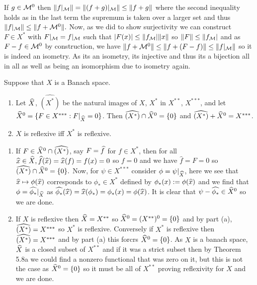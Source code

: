 \documentclass[12pt,a4paper]{article}
\begin{document}
\begin{solution}
\begin{enumerate}[label=\alph*.]
            If $g\in\mathcal{M}^0$ then $\|f|_{\mathcal{M}}\|=\|(f+g)|_{\mathcal{M}}\|\leq\|f+g\|$ where the second inequality holds as in the last term the supremum is taken over a larger set and thus $\|f|_{\mathcal{M}}\|\leq\|f+\mathcal{M}^0\|.$ 
            Now, as we did to show surjectivity we can construct $F\in X^*$ with $F|_{\mathcal{M}}=f|_{\mathcal{M}}$ such that $|F(x)|\leq\|f_{\mathcal{M}}|\|x\|$ so $\|F\|\leq\|f_{\mathcal{M}}|$ and as $F-f\in\mathcal{M}^0$ by construction, we have $\|f+\mathcal{M}^0\|\leq\|f+(F-f)\|\leq\|f|_{\mathcal{M}}\|$ so it is indeed an isometry. 
            As its an isometry, its injective and thus its a bijection all in all as well as being an isomorphism due to isometry again. 
    \end{enumerate}
\end{solution}
\begin{problem}\label{prob:5-24}
Suppose that $X$ is a Banach space.
\begin{enumerate}[label=\alph*.]
\item Let $\widehat{X}$, $\widehat{(X^*)}$ be the natural images of $X$, $X^*$ in $X^{**}$, $X^{***}$, and let $\widehat{X}^0 = \{F \in X^{***} : F|_{\widehat{X}} = 0\}$. Then $\widehat{(X^*)} \cap \widehat{X}^0 = \{0\}$ and $\widehat{(X^*)} + \widehat{X}^0 = X^{***}$.
\item $X$ is reflexive iff $X^*$ is reflexive.
\end{enumerate}
\end{problem}
\begin{solution}
    \begin{enumerate}[label=\alph*.]
        \item If $F\in\widehat{X}^0\cap\widehat{(X^*)}$, say $F=\widehat{f}$ for $f\in X^*$, then for all $\widehat{x}\in\widehat{X},\widehat{f}(\widehat{x})=\widehat{x}(f)=f(x)=0$ so $f=0$ and we have $\hat{f}=F=0$ so $\widehat{(X^*)}\cap\widehat{X}^0= \qty{0}.$ 
            Now, for $\psi\in X^{***}$ consider $\phi=\psi|_{\widehat{X}}$, here we see that $\widehat{x}\mapsto\phi(\widehat{x})$ corresponds to $\phi_*\in X^*$ defined by $\phi_*(x):=\phi(\widehat{x})$ and we find that $\phi=\widehat{\phi_*}|_{\widehat{X}}$ as $\widehat{\phi_*}(\widehat{x})=\widehat{x}(\phi_*)=\phi_*(x)=\phi(\widehat{x})$. 
            It is clear that $\psi-\widehat{\phi_*}\in\widehat{X}^0$ so we are done. 
        \item If $X$ is reflexive then $\widehat{X}=X^{**}$ so $\widehat{X}^0=(X^{**})^0= \qty{0}$ and by part (a), $\widehat{(X^*)}=X^{***}$ so $X^*$ is reflexive. 
            Conversely if $X^*$ is reflexive then $\widehat{(X^*)}=X^{***}$ and by part (a) this forcrs $\widehat{X}^0= \qty{0}$. 
            As $X$ is a banach space, $\widehat{X}$ is a closed subset of $X^{**}$ and if it was a strict subset then by Theorem 5.8a we could find a nonzero functional that was zero on it, but this is not the case as $\widehat{X}^0=\qty{0}$ so it must be all of $X^{**}$ proving reflexivity for $X$ and we are done. 
    \end{enumerate}
\end{solution}
\end{document}
